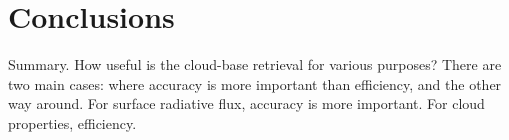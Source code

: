 \documentclass{article}
\begin{document}
\section{Conclusions}
\label{sec:conclusions}
\par Summary.  How useful is the cloud-base retrieval for various purposes?
There are two main cases: where accuracy is more important than efficiency, and
the other way around.  For surface radiative flux, accuracy is more important.
For cloud properties, efficiency.

\par 
\end{document}
